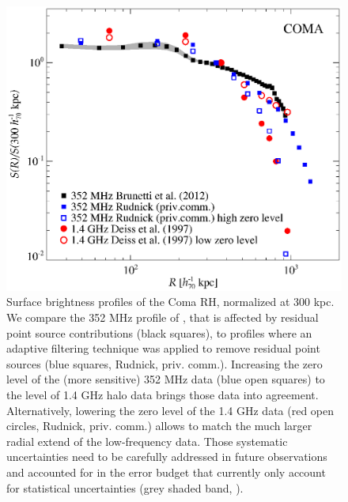 \documentclass[useAMS,usenatbib]{mn2e}
\begin{document}
\begin{figure} 
\centering
\includegraphics[width=\columnwidth]{figures/SB_Coma_norm_band.eps}
\caption{Surface brightness profiles of the Coma RH, normalized at 300
  kpc. We compare the 352 MHz profile of \citet{2012arXiv1207.3025B}, that is
  affected by residual point source contributions (black squares), to profiles
  where an adaptive filtering technique was applied to remove residual point
  sources (blue squares, Rudnick, priv. comm.). Increasing the zero level of the
  (more sensitive) 352 MHz data (blue open squares) to the level of 1.4 GHz halo
  data \citep[red filled circles,][]{1997A&A...321...55D} brings those data into
  agreement. Alternatively, lowering the zero level of the 1.4 GHz data (red
  open circles, Rudnick, priv. comm.) allows to match the much larger radial
  extend of the low-frequency data. Those systematic uncertainties need to be
  carefully addressed in future observations and accounted for in the error
  budget that currently only account for statistical uncertainties (grey shaded
  band, \citealp{2012arXiv1207.3025B}).}
\label{fig:SB_Coma}
\end{figure}
\end{document}
